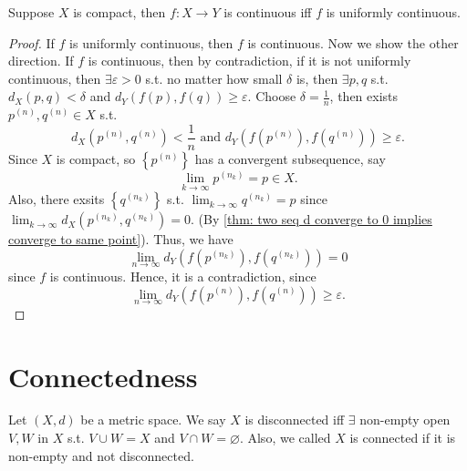 \begin{theorem}
    Suppose \(X\) is compact, then \(f:X \to Y\) is continuous iff \(f\) is uniformly continuous.   
\end{theorem}
\begin{proof}
    If \(f\) is uniformly continuous, then \(f\) is continuous. Now we show the other direction. If \(f\) is continuous, then by contradiction, if it is not uniformly continuous, then \(\exists \varepsilon > 0\) s.t. no matter how small \(\delta \) is, then \(\exists p, q\) s.t. \(d_X(p, q) < \delta \) and \(d_Y(f(p), f(q)) \ge \varepsilon \). Choose \(\delta = \frac{1}{n}\), then exists \(p^{(n)}, q^{(n)} \in X\) s.t. 
    \[
        d_X \left( p^{(n)}, q^{(n)} \right) < \frac{1}{n} \text{ and } d_Y \left( f \left( p^{(n)}\right), f \left( q^{(n)}  \right)   \right) \ge \varepsilon.  
    \]  Since \(X\) is compact, so \(\left\{ p^{(n)} \right\} \) has a convergent subsequence, say 
    \[
        \lim_{k \to \infty} p^{(n_k)} = p \in X.  
    \] Also, there exsits \(\left\{ q^{(n_k)} \right\} \) s.t. \(\lim_{k \to \infty} q^{(n_k)} = p \) since \(\lim_{k \to \infty} d_X \left( p^{(n_k)}, q^{(n_k)} \right) = 0  \). (By \autoref{thm: two seq d converge to 0 implies converge to same point}). Thus, we have 
    \[
        \lim_{n \to \infty} d_Y \left( f \left( p^{(n_k)} \right) , f \left( q^{(n_k)} \right)  \right) = 0 
    \] since \(f\) is continuous. 
    Hence, it is a contradiction, since
    \[
        \lim_{n \to \infty} d_Y \left( f \left( p^{(n)} \right), f \left( q^{(n)} \right)   \right) \ge \varepsilon. 
    \]
\end{proof}

\section{Connectedness}
\begin{definition} \label{def: disconnected/connected}
    Let \((X, d)\) be a metric space. We say \(X\) is disconnected iff \(\exists \) non-empty open \(V, W\) in \(X\) s.t. \(V \cup W = X\) and \(V \cap W = \varnothing \). Also, we called \(X\) is connected if it is non-empty and not disconnected.       
\end{definition}

